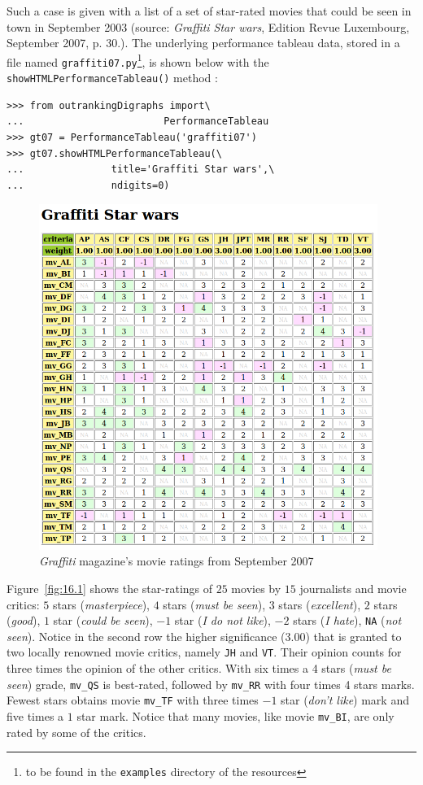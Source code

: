 Such a case is given with  a list of a set of star-rated movies that could be seen in town in September 2003 (source: \emph{Graffiti Star wars}, Edition Revue Luxembourg, September 2007, p. 30.). The underlying performance tableau data, stored in a file named \texttt{graffiti07.py}\footnote{to be found in the \texttt{examples} directory of the \Digraph resources}, is shown below with the \texttt{showHTMLPerformance\-Tableau()} method  : 
\begin{lstlisting}
>>> from outrankingDigraphs import\
...                        PerformanceTableau 
>>> gt07 = PerformanceTableau('graffiti07')
>>> gt07.showHTMLPerformanceTableau(\
...               title='Graffiti Star wars',\
...               ndigits=0)
\end{lstlisting}
\begin{figure}[h]
\includegraphics[width=11cm]{Figures/16-1-graffiti07_1.png}
\caption{\emph{Graffiti} magazine's movie ratings from September 2007}
\label{fig:16.1}       %
\end{figure}

Figure~\vref{fig:16.1} shows the star-ratings of $25$ movies by $15$ journalists and movie critics: $5$ stars (\emph{masterpiece}), $4$ stars (\emph{must be seen}), $3$ stars (\emph{excellent}), $2$ stars (\emph{good}), $1$ star (\emph{could be seen}), $-1$ star (\emph{I do not like}), $-2$ stars (\emph{I hate}), \texttt{NA} (\emph{not seen}). Notice in the second row the higher significance ($3.00$) that is granted to two locally renowned movie critics, namely \texttt{JH} and \texttt{VT}. Their opinion counts for three times the opinion of the other critics. With six times a 4 stars (\emph{must be seen}) grade, \texttt{mv\_QS} is best-rated, followed by \texttt{mv\_RR} with four times 4 stars marks. Fewest stars obtains movie \texttt{mv\_TF} with three times $-1$ star (\emph{don't like}) mark and five times a $1$ star mark. Notice that many movies, like movie \texttt{mv\_BI}, are only rated by some of the critics. 

